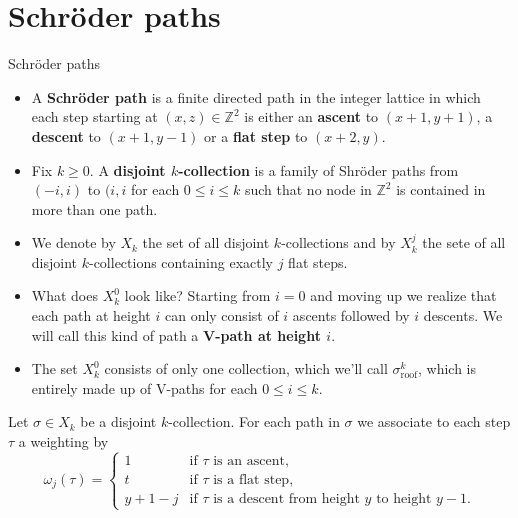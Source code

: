 \documentclass[12pt,mathserif]{beamer}
\begin{document}
\section{Schröder paths}

\begin{frame}[allowframebreaks]{Schröder paths}

\begin{definition}
\begin{itemize}
\item A \textbf{Schröder path} is a finite directed path in the integer lattice in which each step starting at $(x,z) \in \mathbb{Z}^2$ is either an \textbf{ascent} to $(x+1,y+1)$, a \textbf{descent} to $(x+1,y-1)$ or a \textbf{flat step} to $(x+2,y)$.
\item Fix $k\geq0$. A \textbf{disjoint $k$-collection} is a family of Shröder paths from $(-i,i)$ to $(i,i$ for each $0\leq i \leq k$ such that no node in $\mathbb{Z}^2$ is contained in more than one path.
\item We denote by $X_k$ the set of all disjoint $k$-collections and by $X_k^j$ the sete of all disjoint $k$-collections containing exactly $j$ flat steps.
\end{itemize}
\end{definition}

\framebreak

\begin{itemize}
\item What does $X_k^0$ look like? Starting from $i = 0$ and moving up we realize that each path at height $i$ can only consist of $i$ ascents followed by $i$ descents. We will call this kind of path a \textbf{V-path at height $i$}. 
\item The set $X_k^0$ consists of only one collection, which we'll call $\sigma_{\text{roof}}^k$, which is entirely made up of V-paths for each $0\leq i \leq k$.
\end{itemize}

\framebreak

Let $\sigma \in X_k$ be a disjoint $k$-collection. For each path in $\sigma$ we associate to each step $\tau$ a weighting by
\begin{equation*}
\omega_j(\tau) = \begin{cases}
1 &\text{if $\tau$ is an ascent}, \\
t &\text{if $\tau$ is a flat step}, \\
y+1-j &\text{if $\tau$ is a descent from height $y$ to height $y-1$}.
\end{cases}
\end{equation*}


\end{frame}
\end{document}
